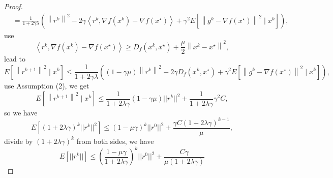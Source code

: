\documentclass[12pt,a4paper]{article}
\begin{document}
\begin{proof}
$$\begin{aligned}
			& \stackrel{}{=}\frac{1}{1+2\gamma\lambda}(\left\|r^{k}\right\|^{2}-2 \gamma\left\langle r^{k}, \nabla f\left(x^{k}\right)-\nabla f\left(x^{\star}\right)\right\rangle+\gamma^{2} E\left[\left\|g^{k}-\nabla f\left(x^{\star}\right)\right\|^{2} \mid x^{k}\right]),
		\end{aligned}
		$$
		use $$
		\left\langle r^{k}, \nabla f\left(x^{k}\right)-\nabla f\left(x^{\star}\right)\right\rangle \stackrel{}{\geq} D_{f}\left(x^{k}, x^{\star}\right)+\frac{\mu}{2}\left\|x^{k}-x^{\star}\right\|^{2},
		$$
		lead to 
		$$
		E\left[\left\|r^{k+1}\right\|^{2} \mid x^{k}\right] \leq\frac{1}{1+2\gamma\lambda}\left((1-\gamma \mu)\left\|r^{k}\right\|^{2}-2 \gamma D_{f}\left(x^{k}, x^{\star}\right)+\gamma^{2} E\left[\left\|g^{k}-\nabla f\left(x^{\star}\right)\right\|^{2} \mid x^{k}\right]\right),
		$$
		use Assumption (2), we get 
		$$
			E\left[\left\|r^{k+1}\right\|^{2} \mid x^{k}\right] \leq \frac{1}{1+2\lambda\gamma}(1-\gamma\mu)||r^k||^2+\frac{1}{1+2\lambda\gamma}{\gamma^2C},
		$$
		so we have 
		$$
		E\left[(1+2\lambda\gamma)^k||r^k||^2\right]\leq (1-\mu\gamma)^k||r^0||^2+\frac{\gamma C(1+2\lambda\gamma)^{k-1}}{\mu},
		$$
		divide by $(1+2\lambda\gamma)^k$ from both sides, we have 
		$$
		E\left[||r^k||\right]\leq (\frac{1-\mu\gamma}{1+2\lambda\gamma})^k||r^0||^2+ \frac{C\gamma}{\mu(1+2\lambda\gamma)}
		$$
	\end{proof}
\end{document}

